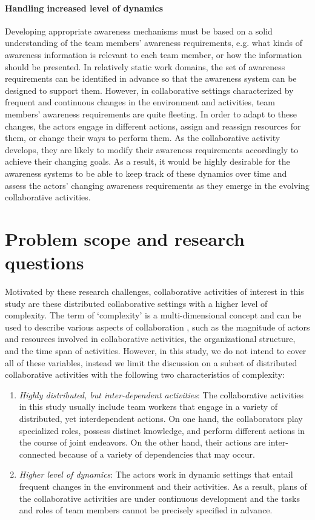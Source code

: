 \paragraph*{Handling increased level of dynamics}
Developing appropriate awareness mechanisms must be based on a solid understanding of the team members' awareness requirements, e.g. what kinds of awareness information is relevant to each team member, or how the information should be presented. In relatively static work domains, the set of awareness requirements can be identified in advance so that the awareness system can be designed to support them. However, in collaborative settings characterized by frequent and continuous changes in the environment and activities, team members' awareness requirements are quite fleeting. In order to adapt to these changes, the actors engage in different actions, assign and reassign resources for them, or change their ways to perform them. As the collaborative activity develops, they are likely to modify their awareness requirements accordingly to achieve their changing goals. As a result, it would be highly desirable for the awareness systems to be able to keep track of these dynamics over time and assess the actors' changing awareness requirements as they emerge in the evolving collaborative activities.

\section{Problem scope and research questions}
\label{sec:problem_scope}
 Motivated by these research challenges, collaborative activities of interest in this study are these distributed collaborative settings with a higher level of complexity. The term of `complexity' is a multi-dimensional concept and can be used to describe various aspects of collaboration \cite{Schmidt2002}, such as the magnitude of actors and resources involved in collaborative activities, the organizational structure, and the time span of activities. However, in this study, we do not intend to cover all of these variables, instead we limit the discussion on a subset of distributed collaborative activities with the following two characteristics of complexity:

\begin{enumerate}
\item \emph{Highly distributed, but inter-dependent activities}: The collaborative activities in this study usually include team workers that engage in a variety of distributed, yet interdependent actions. On one hand, the collaborators play specialized roles, possess distinct knowledge, and perform different actions in the course of joint endeavors. On the other hand, their actions are inter-connected because of a variety of dependencies that may occur. 

\item \emph{Higher level of dynamics}: The actors work in dynamic settings that entail frequent changes in the environment and their activities. As a result, plans of the collaborative activities are under continuous development and the tasks and roles of team members cannot be precisely specified in advance.
\end{enumerate}

